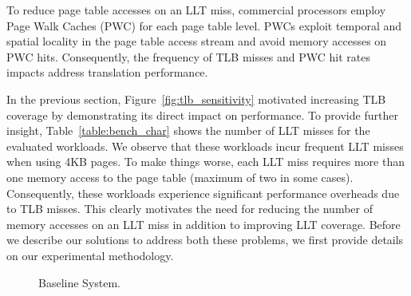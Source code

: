 


To reduce page table accesses on an LLT miss, commercial processors
employ Page Walk Caches (PWC) for each page table level. PWCs exploit
temporal and spatial locality in the page table access stream and
avoid memory accesses on PWC hits. Consequently, the frequency of TLB
misses and PWC hit rates impacts address translation performance.



In the previous section, Figure~\ref{fig:tlb_sensitivity} motivated
increasing TLB coverage by demonstrating its direct impact on
performance. To provide further insight, Table~\ref{table:bench_char}
shows the number of LLT misses for the evaluated workloads. We observe
that these workloads incur frequent LLT misses when using 4KB pages.
To make things worse, each LLT miss requires more than one memory
access to the page table (maximum of two in some cases). Consequently,
these workloads experience significant performance overheads due to
TLB misses. This clearly motivates the need for reducing the number of
memory accesses on an LLT miss in addition to improving LLT coverage.
Before we describe our solutions to address both these problems, we
first provide details on our experimental methodology.

\begin{figure}[t]
\vspace{0. in}
\centering
\centerline{}

        \caption{\small Baseline System. \normalsize}

\label{fig:config}
\vspace{-0.15 in}
\end{figure}

